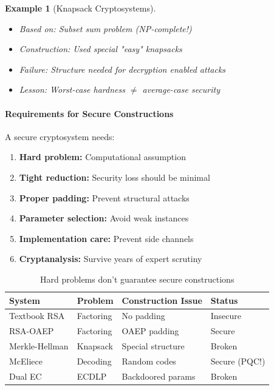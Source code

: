 \documentclass[11pt,a4paper]{article}
\newtheorem{example}{Example}
\begin{document}
\begin{example}[Knapsack Cryptosystems]
\begin{itemize}
    \item Based on: Subset sum problem (NP-complete!)
    \item Construction: Used special "easy" knapsacks
    \item Failure: Structure needed for decryption enabled attacks
    \item Lesson: Worst-case hardness $\neq$ average-case security
\end{itemize}
\end{example}

\paragraph{Requirements for Secure Constructions}

A secure cryptosystem needs:

\begin{enumerate}
    \item \textbf{Hard problem:} Computational assumption
    \item \textbf{Tight reduction:} Security loss should be minimal
    \item \textbf{Proper padding:} Prevent structural attacks
    \item \textbf{Parameter selection:} Avoid weak instances
    \item \textbf{Implementation care:} Prevent side channels
    \item \textbf{Cryptanalysis:} Survive years of expert scrutiny
\end{enumerate}

\begin{table}[h]
\centering
\begin{tabular}{|l|l|l|l|}
\hline
\textbf{System} & \textbf{Problem} & \textbf{Construction Issue} & \textbf{Status} \\
\hline
Textbook RSA & Factoring & No padding & Insecure \\
RSA-OAEP & Factoring & OAEP padding & Secure \\
Merkle-Hellman & Knapsack & Special structure & Broken \\
McEliece & Decoding & Random codes & Secure (PQC!) \\
Dual EC & ECDLP & Backdoored params & Broken \\
\hline
\end{tabular}
\caption{Hard problems don't guarantee secure constructions}
\end{table}
\end{document}
